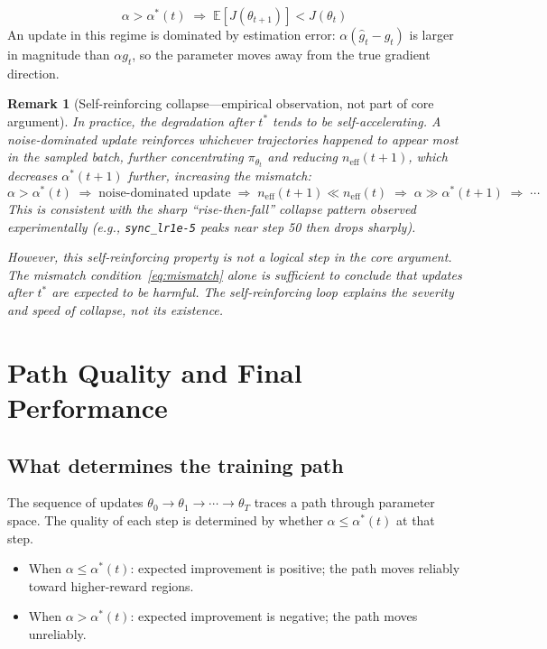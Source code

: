 \documentclass[11pt,a4paper]{article}
\newcommand{\E}{\mathbb{E}}
\newcommand{\neff}{n_{\mathrm{eff}}}
\newcommand{\ghat}{\hat{g}_t}
\newcommand{\gtrue}{g_t}
\newcommand{\pith}{\pi_{\theta_t}}
\newcommand{\alphaopt}{\alpha^*(t)}
\newtheorem{remark}{Remark}
\begin{document}
\begin{equation}
  \alpha > \alphaopt
  \;\Rightarrow\;
  \E[J(\theta_{t+1})] < J(\theta_t)
  \label{eq:mismatch}
\end{equation}
An update in this regime is dominated by estimation error: $\alpha(\ghat - \gtrue)$ is larger
in magnitude than $\alpha\gtrue$, so the parameter moves away from the true gradient direction.

\begin{remark}[Self-reinforcing collapse---empirical observation, not part of core argument]
  \label{rem:self-reinforce}
  In practice, the degradation after $t^*$ tends to be self-accelerating.
  A noise-dominated update reinforces whichever trajectories happened to appear most in the sampled batch,
  further concentrating $\pith$ and reducing $\neff(t+1)$, which decreases $\alpha^*(t+1)$
  further, increasing the mismatch:
  \begin{equation}
    \alpha > \alpha^*(t)
    \;\Rightarrow\;
    \text{noise-dominated update}
    \;\Rightarrow\;
    \neff(t+1) \ll \neff(t)
    \;\Rightarrow\;
    \alpha \gg \alpha^*(t+1)
    \;\Rightarrow\;
    \cdots
    \label{eq:feedback-loop}
  \end{equation}
  This is consistent with the sharp ``rise-then-fall'' collapse pattern observed experimentally
  (e.g., \texttt{sync\_lr1e-5} peaks near step 50 then drops sharply).

  However, this self-reinforcing property is \emph{not} a logical step in the core argument.
  The mismatch condition~\eqref{eq:mismatch} alone is sufficient to conclude that updates
  after $t^*$ are expected to be harmful.
  The self-reinforcing loop explains the \emph{severity and speed} of collapse, not its existence.
\end{remark}

\section{Path Quality and Final Performance}

\subsection{What determines the training path}

The sequence of updates $\theta_0 \to \theta_1 \to \cdots \to \theta_T$ traces a path
through parameter space.
The quality of each step is determined by whether $\alpha \leq \alphaopt$ at that step.
\begin{itemize}
  \item When $\alpha \leq \alphaopt$: expected improvement is positive; the path moves reliably toward higher-reward regions.
  \item When $\alpha > \alphaopt$: expected improvement is negative; the path moves unreliably.
\end{itemize}
\end{document}
